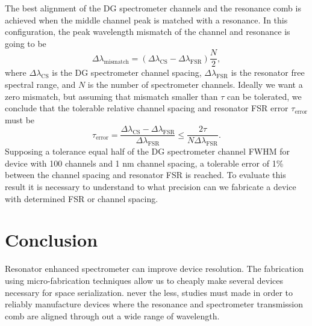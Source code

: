 \documentclass[12pt,twoside,english]{book}
\renewcommand{\~}{\perispomeni}%
\numberwithin{equation}{section}
\numberwithin{figure}{section}
\newcommand\fnurl[2]{%
 \href{#2}{#1}\footnote{\url{#2}}%
}
\begin{document}
The best alignment of the DG spectrometer channels and the resonance comb is achieved when the middle channel peak is matched with a resonance. In this configuration, the peak wavelength mismatch of the channel and resonance is going to be
\begin{equation}
\Delta\lambda_{\text{mismatch}}=\left(\Delta\lambda_{\text{CS}}-\Delta\lambda_{\text{FSR}}\right)\frac{N}{2},
\label{eq:missmatch}
\end{equation}
where $\Delta\lambda_{\text{CS}}$ is the DG spectrometer channel spacing, $\Delta\lambda_{\text{FSR}}$ is the resonator free spectral range, and $N$ is the number of spectrometer channels. Ideally we want a zero mismatch, but assuming that mismatch smaller than $\tau$ can be tolerated, we conclude that the tolerable relative channel spacing and resonator FSR error $\tau_{\text{error}}$ must be
\begin{equation}
\tau_{\text{error}}=\frac{\Delta\lambda_{\text{CS}}-\Delta\lambda_{\text{FSR}}}{\Delta\lambda_{\text{FSR}}}\le\frac{2\tau}{N\Delta\lambda_{\text{FSR}}}.
\label{eq:tolerable error}
\end{equation}
Supposing a tolerance equal half of the DG spectrometer channel FWHM for device with 100 channels and 1 nm channel spacing, a tolerable error of 1\% between the channel spacing and resonator FSR is reached.
To evaluate this result it is necessary to understand to what precision can we fabricate a device with determined FSR or channel spacing.

%
%


\section{Conclusion}
Resonator enhanced spectrometer can improve device resolution. The fabrication using micro-fabrication techniques allow us to cheaply make several devices necessary for space serialization. never the less, studies must made in order to reliably manufacture devices where the resonance and spectrometer transmission comb are aligned through out a wide range of wavelength.
\end{document}
